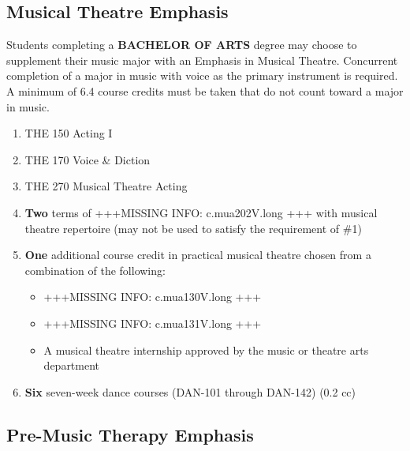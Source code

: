\documentclass[
  letterpaper,
]{scrbook}
\providecommand{\tightlist}{%
  \setlength{\itemsep}{0pt}\setlength{\parskip}{0pt}}
\begin{document}
\subsection{Musical Theatre Emphasis}\label{musical-theatre-emphasis}

Students completing a \textbf{BACHELOR OF ARTS} degree may choose to
supplement their music major with an Emphasis in Musical Theatre.
Concurrent completion of a major in music with voice as the primary
instrument is required. A minimum of 6.4 course credits must be taken
that do not count toward a major in music.

\begin{enumerate}
\def\labelenumi{\arabic{enumi}.}
\tightlist
\item
  THE 150 Acting I
\item
  THE 170 Voice \& Diction
\item
  THE 270 Musical Theatre Acting
\item
  \textbf{Two} terms of +++MISSING INFO: c.mua202V.long +++ with musical
  theatre repertoire (may not be used to satisfy the requirement of \#1)
\item
  \textbf{One} additional course credit in practical musical theatre
  chosen from a combination of the following:

  \begin{itemize}
  \tightlist
  \item
    +++MISSING INFO: c.mua130V.long +++
  \item
    +++MISSING INFO: c.mua131V.long +++
  \item
    A musical theatre internship approved by the music or theatre arts
    department
  \end{itemize}
\item
  \textbf{Six} seven-week dance courses (DAN-101 through DAN-142) (0.2
  cc)
\end{enumerate}

\subsection{Pre-Music Therapy
Emphasis}\label{pre-music-therapy-emphasis}
\end{document}
